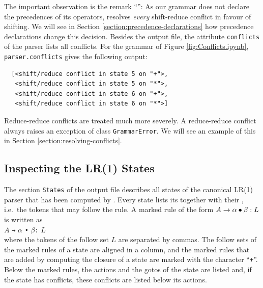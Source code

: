 The important observation is the remark ``'':  As our grammar does not
declare the precedences of its operators,  resolves \emph{every} shift-reduce conflict in favour
of shifting.  We will see in Section \ref{section:precedence-declarations} how precedence declarations change this
decision.  Besides the output file, the attribute \texttt{conflicts} of the parser lists all conflicts.  For the
grammar of Figure \ref{fig:Conflicts.ipynb}, \texttt{parser.conflicts} gives the following output:
\begin{verbatim}
  [<shift/reduce conflict in state 5 on "+">,
   <shift/reduce conflict in state 5 on "*">,
   <shift/reduce conflict in state 6 on "+">,
   <shift/reduce conflict in state 6 on "*">]                
\end{verbatim}
Reduce-reduce conflicts are treated much more severely.  A reduce-reduce conflict always raises an
exception of class \texttt{GrammarError}.  We will see an example of this in Section
\ref{section:resolving-conflicts}. 

\subsection{Inspecting the LR(1) States}
The section \texttt{States} of the output file describes all states of the canonical LR(1) parser that has been
computed by .  Every state lists its  together with their
, i.e.~the tokens that may follow the rule.  A marked rule of the form
$A \rightarrow \alpha \mdot \beta: L$ is written as
\\[0.2cm]
\hspace*{1.3cm}
$A$ \texttt{→} $\alpha$ \texttt{•} $\beta$\texttt{:} $L$
\\[0.2cm]
where the tokens of the follow set $L$ are separated by commas.  The follow sets of the marked rules of a state
are aligned in a column, and the marked rules that are added by computing the closure of a state are marked with the character
``\texttt{+}''.  Below the marked rules, the actions and the gotos of the state are listed and, if the state has
conflicts, these conflicts are listed below its actions.

